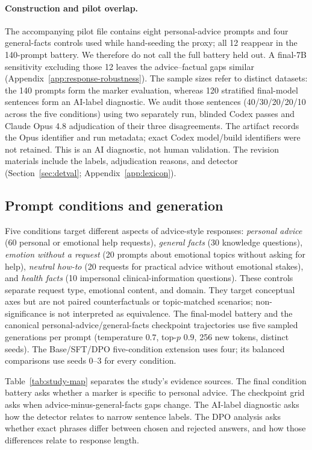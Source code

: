 \documentclass[11pt]{article}
\begin{document}
\paragraph{Construction and pilot overlap.} The accompanying pilot file contains eight
personal-advice prompts and four general-facts controls used while hand-seeding the proxy; all
12 reappear in the 140-prompt battery. We therefore do not call the full battery
held out. A final-7B sensitivity excluding those 12 leaves the advice--factual
gaps similar (Appendix~\ref{app:response-robustness}). The sample sizes refer to
distinct datasets: the 140 prompts form the marker evaluation, whereas 120 stratified final-model
sentences form an AI-label diagnostic. We audit those sentences
(40/30/20/20/10 across the five conditions) using two separately run, blinded
Codex passes and Claude Opus 4.8 adjudication of their three disagreements.
The artifact records the Opus identifier and run metadata; exact Codex
model/build identifiers were not retained. This is an AI diagnostic, not human
validation. The revision materials include the labels, adjudication
reasons, and detector (Section~\ref{sec:detval};
Appendix~\ref{app:lexicon}).

\subsection{Prompt conditions and generation}
\label{sec:method-battery}
Five conditions target different aspects of advice-style responses:
\emph{personal advice} (60 personal or emotional help requests), \emph{general
facts} (30 knowledge questions), \emph{emotion without a request} (20 prompts
about emotional topics without asking for help), \emph{neutral how-to} (20
requests for practical advice without emotional stakes), and \emph{health
facts} (10 impersonal clinical-information questions). These controls separate
request type, emotional content, and domain. They target conceptual axes but are
not paired counterfactuals or topic-matched scenarios; non-significance is not
interpreted as equivalence. The final-model battery and the canonical
personal-advice/general-facts checkpoint trajectories use five sampled generations
per prompt (temperature $0.7$, top-$p$ $0.9$, 256 new tokens, distinct seeds).
The Base/SFT/DPO five-condition extension uses four; its
balanced comparisons use seeds 0--3 for every condition.

Table~\ref{tab:study-map} separates the study's evidence sources. The final
condition battery asks whether a marker is specific to personal advice. The
checkpoint grid asks when advice-minus-general-facts gaps change. The AI-label
diagnostic asks how the detector relates to narrow sentence labels. The DPO
analysis asks whether exact phrases differ between chosen and rejected answers,
and how those differences relate to response length.
\end{document}
